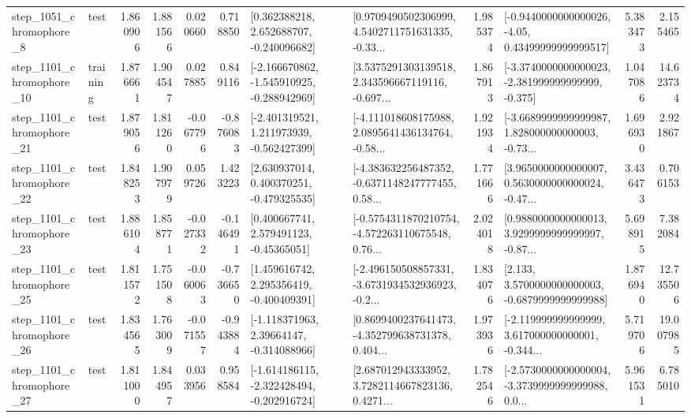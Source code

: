 \begin{tabular}{llrrrrllrlrr}
  step\_1051\_chromophore\_8 &      test &      1.860906 &    1.881566 &      0.020660 &  0.718850 &    [0.362388218, 2.652688707, -0.240096682] &  [0.9709490502306999, 4.5402711751631335, -0.33... &       1.985374 &  [-0.9440000000000026, -4.05, 0.43499999999999517] &            5.383473 &          2.155465 \\
 step\_1101\_chromophore\_10 &  training &      1.876661 &    1.904547 &      0.027885 &  0.849116 &  [-2.166670862, -1.545910925, -0.288942969] &  [3.5375291303139518, 2.343596667119116, -0.697... &       1.867913 &  [-3.3740000000000023, -2.381999999999999, -0.375] &            1.047086 &         14.623734 \\
 step\_1101\_chromophore\_21 &      test &      1.879056 &    1.811260 &     -0.067796 & -0.876083 &   [-2.401319521, 1.211973939, -0.562427399] &  [-4.111018608175988, 2.0895641436134764, -0.58... &       1.921934 &  [-3.6689999999999987, 1.828000000000003, -0.73... &            1.696930 &          2.921867 \\
 step\_1101\_chromophore\_22 &      test &      1.848253 &    1.907979 &      0.059726 &  1.423223 &    [2.630937014, 0.400370251, -0.479325535] &  [-4.383632256487352, -0.6371148247777455, 0.58... &       1.771666 &  [3.9650000000000007, 0.5630000000000024, -0.47... &            3.436473 &          0.706153 \\
 step\_1101\_chromophore\_23 &      test &      1.886104 &    1.858771 &     -0.027332 & -0.146491 &     [0.400667741, 2.579491123, -0.45365051] &  [-0.5754311870210754, -4.572263110675548, 0.76... &       2.024018 &  [0.9880000000000013, 3.9299999999999997, -0.87... &            5.698915 &          7.382084 \\
 step\_1101\_chromophore\_25 &      test &      1.811572 &    1.751508 &     -0.060063 & -0.736650 &    [1.459616742, 2.295356419, -0.400409391] &  [-2.496150508857331, -3.6731934532936923, -0.2... &       1.834076 &   [2.133, 3.5700000000000003, -0.6879999999999988] &            1.876940 &         12.735506 \\
 step\_1101\_chromophore\_26 &      test &      1.834565 &    1.763009 &     -0.071557 & -0.943884 &    [-1.118371963, 2.39664147, -0.314088966] &  [0.8699400237641473, -4.352799638731378, 0.404... &       1.973936 &  [-2.119999999999999, 3.617000000000001, -0.344... &            5.719706 &         19.007985 \\
 step\_1101\_chromophore\_27 &      test &      1.811000 &    1.844957 &      0.033956 &  0.958584 &  [-1.614186115, -2.322428494, -0.202916724] &  [2.687012943333952, 3.7282114667823136, 0.4271... &       1.782546 &  [-2.5730000000000004, -3.3739999999999988, 0.0... &            5.961531 &          6.785010 \\

\end{tabular}
